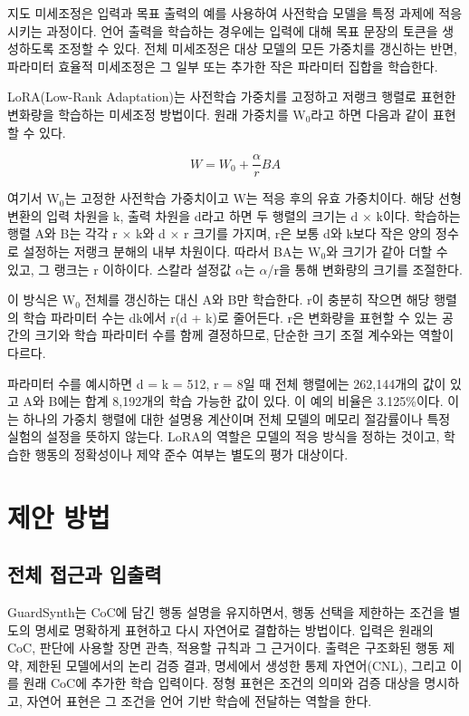 \documentclass[10pt,a4paper,twocolumn]{article}\usepackage[margin=18mm]{geometry}\usepackage{fontspec,kotex}
\begin{document}
지도 미세조정은 입력과 목표 출력의 예를 사용하여 사전학습 모델을 특정 과제에 적응시키는 과정이다. 언어 출력을 학습하는 경우에는 입력에 대해 목표 문장의 토큰을 생성하도록 조정할 수 있다. 전체 미세조정은 대상 모델의 모든 가중치를 갱신하는 반면, 파라미터 효율적 미세조정은 그 일부 또는 추가한 작은 파라미터 집합을 학습한다.\par

LoRA(Low-Rank Adaptation)는 사전학습 가중치를 고정하고 저랭크 행렬로 표현한 변화량을 학습하는 미세조정 방법이다. 원래 가중치를 W\ensuremath{_0}라고 하면 다음과 같이 표현할 수 있다. \cite{r14}\par

\[W=W_0+\frac{\alpha}{r}BA\]

여기서 W\ensuremath{_0}는 고정한 사전학습 가중치이고 W는 적응 후의 유효 가중치이다. 해당 선형 변환의 입력 차원을 k, 출력 차원을 d라고 하면 두 행렬의 크기는 d \ensuremath{\times} k이다. 학습하는 행렬 A와 B는 각각 r \ensuremath{\times} k와 d \ensuremath{\times} r 크기를 가지며, r은 보통 d와 k보다 작은 양의 정수로 설정하는 저랭크 분해의 내부 차원이다. 따라서 BA는 W\ensuremath{_0}와 크기가 같아 더할 수 있고, 그 랭크는 r 이하이다. 스칼라 설정값 \ensuremath{\alpha}는 \ensuremath{\alpha}/r을 통해 변화량의 크기를 조절한다. \cite{r14}\par

이 방식은 W\ensuremath{_0} 전체를 갱신하는 대신 A와 B만 학습한다. r이 충분히 작으면 해당 행렬의 학습 파라미터 수는 dk에서 r(d + k)로 줄어든다. r은 변화량을 표현할 수 있는 공간의 크기와 학습 파라미터 수를 함께 결정하므로, 단순한 크기 조절 계수와는 역할이 다르다.\par

파라미터 수를 예시하면 d = k = 512, r = 8일 때 전체 행렬에는 262,144개의 값이 있고 A와 B에는 합계 8,192개의 학습 가능한 값이 있다. 이 예의 비율은 3.125\%이다. 이는 하나의 가중치 행렬에 대한 설명용 계산이며 전체 모델의 메모리 절감률이나 특정 실험의 설정을 뜻하지 않는다. LoRA의 역할은 모델의 적응 방식을 정하는 것이고, 학습한 행동의 정확성이나 제약 준수 여부는 별도의 평가 대상이다.\par
\section{제안 방법}

\subsection{전체 접근과 입출력}

GuardSynth는 CoC에 담긴 행동 설명을 유지하면서, 행동 선택을 제한하는 조건을 별도의 명세로 명확하게 표현하고 다시 자연어로 결합하는 방법이다. 입력은 원래의 CoC, 판단에 사용할 장면 관측, 적용할 규칙과 그 근거이다. 출력은 구조화된 행동 제약, 제한된 모델에서의 논리 검증 결과, 명세에서 생성한 통제 자연어(CNL), 그리고 이를 원래 CoC에 추가한 학습 입력이다. 정형 표현은 조건의 의미와 검증 대상을 명시하고, 자연어 표현은 그 조건을 언어 기반 학습에 전달하는 역할을 한다.\par
\end{document}
